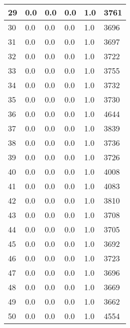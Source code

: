 \begin{longtable}{|l|l|l|l|l|l|}
29 & 0.0 & 0.0 & 0.0 & 1.0 & 3761 \\ \hline 
30 & 0.0 & 0.0 & 0.0 & 1.0 & 3696 \\ \hline 
31 & 0.0 & 0.0 & 0.0 & 1.0 & 3697 \\ \hline 
32 & 0.0 & 0.0 & 0.0 & 1.0 & 3722 \\ \hline 
33 & 0.0 & 0.0 & 0.0 & 1.0 & 3755 \\ \hline 
34 & 0.0 & 0.0 & 0.0 & 1.0 & 3732 \\ \hline 
35 & 0.0 & 0.0 & 0.0 & 1.0 & 3730 \\ \hline 
36 & 0.0 & 0.0 & 0.0 & 1.0 & 4644 \\ \hline 
37 & 0.0 & 0.0 & 0.0 & 1.0 & 3839 \\ \hline 
38 & 0.0 & 0.0 & 0.0 & 1.0 & 3736 \\ \hline 
39 & 0.0 & 0.0 & 0.0 & 1.0 & 3726 \\ \hline 
40 & 0.0 & 0.0 & 0.0 & 1.0 & 4008 \\ \hline 
41 & 0.0 & 0.0 & 0.0 & 1.0 & 4083 \\ \hline 
42 & 0.0 & 0.0 & 0.0 & 1.0 & 3810 \\ \hline 
43 & 0.0 & 0.0 & 0.0 & 1.0 & 3708 \\ \hline 
44 & 0.0 & 0.0 & 0.0 & 1.0 & 3705 \\ \hline 
45 & 0.0 & 0.0 & 0.0 & 1.0 & 3692 \\ \hline 
46 & 0.0 & 0.0 & 0.0 & 1.0 & 3723 \\ \hline 
47 & 0.0 & 0.0 & 0.0 & 1.0 & 3696 \\ \hline 
48 & 0.0 & 0.0 & 0.0 & 1.0 & 3669 \\ \hline 
49 & 0.0 & 0.0 & 0.0 & 1.0 & 3662 \\ \hline 
50 & 0.0 & 0.0 & 0.0 & 1.0 & 4554 \\ \hline 
\end{longtable}